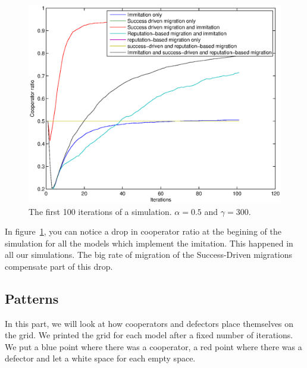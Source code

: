 \documentclass[11pt]{article}
\begin{document}
\begin{figure}[h]
        \includegraphics[width=\textwidth]{../../other/plots/cooperator-ratio-evolution.eps}
	\caption{The first 100 iterations of a simulation. $\alpha = 0.5$ and $\gamma = 300$.}
	\label{fig:ratio_drop}
\end{figure}

In figure~\ref{fig:ratio_drop}, you can notice a drop in cooperator ratio at the begining of the simulation for all the models which implement the imitation. This happened in all our simulations. The big rate of migration of the Success-Driven migrations compensate part of this drop.


\subsection{Patterns}

In this part, we will look at how cooperators and defectors place themselves on the grid. We printed the grid for each model after a fixed number of iterations. We put a blue point where there was a cooperator, a red point where there was a defector and let a white space for each empty space.
\end{document}
